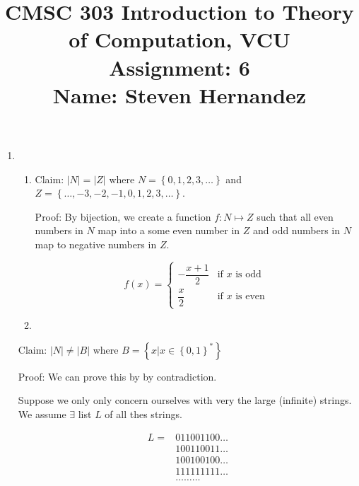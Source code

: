 \documentclass{article}
\newcommand{\set}[1]{{\left\{#1\right\}}}    %
\begin{document}
\title{
    CMSC 303 Introduction to Theory of Computation, VCU\\
    Assignment: 6\\
    Name: Steven Hernandez
}

\date{}

\maketitle
\vspace{-10mm}

\begin{enumerate}
    \item %
        \begin{enumerate}
            \item
                Claim: $|N| = |Z|$ where $N = \set{0,1,2,3,\ldots}$ and $Z = \set{\ldots,-3,-2,-1,0,1,2,3,\ldots}$.

                Proof: By bijection, we create a function $f: N \mapsto Z$ such that all even numbers in $N$ map into a some even number in $Z$ and odd numbers in $N$ map to negative numbers in $Z$.

                \[ f(x) = \begin{cases}
                  -\dfrac{x+1}{2}    & \text{if $x$ is odd}     \\
                  \dfrac{x}{2}       & \text{if $x$ is even}
               	\end{cases}
                \]
            \item
        \end{enumerate}
        	Claim: $|N| \neq |B|$ where $B = \set{x | x \in \set{0,1}^*}$

            Proof: We can prove this by by contradiction.

            Suppose we only only concern ourselves with very the large (infinite) strings.
            We assume $\exists$ list $L$ of all thes strings.

            \begin{equation}
            	\begin{split}
            		L = & 011001100\ldots \\
                		& 100110011\ldots \\
                		& 100100100\ldots \\
                		& 111111111\ldots \\
                        & \ldots\ldots\ldots
                \end{split}
			\end{equation}


\end{enumerate}
\end{document}
